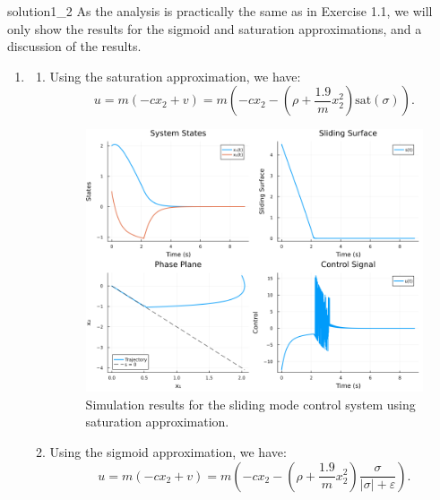 \begin{solution}{}{solution1_2}
	As the analysis is practically the same as in Exercise 1.1, we will only show the results for the sigmoid and saturation approximations, and a discussion of the results.
	\begin{enumerate}[label=\textbf{\alph*)}, start=3]
		\item \begin{enumerate}[label=\textbf{\roman*)}]
			      \item Using the saturation approximation, we have:
			            \[
				            u = m(-c x_2 + v) = m \left( -c x_2 - \left( \rho + \frac{1.9}{m} x_2^2 \right) \text{sat}(\sigma) \right).
			            \]

			            \begin{figure}[H]
				            \centering
				            \includegraphics[width=1\textwidth]{img/problem1_2_sat.png}
				            \caption{Simulation results for the sliding mode control system using saturation approximation.}
				            \label{fig:problem1_2_sat}
			            \end{figure}

			      \item Using the sigmoid approximation, we have:
			            \[
				            u = m(-c x_2 + v) = m \left( -c x_2 - \left( \rho + \frac{1.9}{m} x_2^2 \right) \frac{\sigma}{|\sigma| + \varepsilon} \right).
			            \]


\end{enumerate}
\end{enumerate}
\end{solution}
